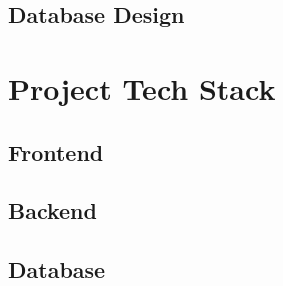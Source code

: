 \subsection{Database Design}

\section{Project Tech Stack}

\subsection{Frontend}

\subsection{Backend}

\subsection{Database}